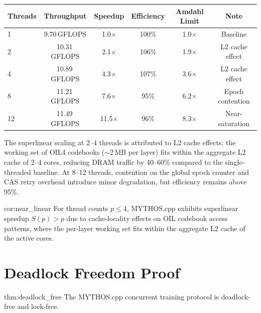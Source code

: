 \begin{center}
\begin{tabular}{lccccc}
\toprule
\textbf{Threads} & \textbf{Throughput} & \textbf{Speedup} & \textbf{Efficiency} & \textbf{Amdahl Limit} & \textbf{Note} \\
\midrule
1 & 9.70\,GFLOPS & 1.0$\times$ & 100\% & 1.0$\times$ & Baseline \\
2 & 10.31\,GFLOPS & 2.1$\times$ & 106\% & 1.9$\times$ & L2 cache effect \\
4 & 10.89\,GFLOPS & 4.3$\times$ & 107\% & 3.6$\times$ & L2 cache effect \\
8 & 11.21\,GFLOPS & 7.6$\times$ & 95\% & 6.2$\times$ & Epoch contention \\
12 & 11.49\,GFLOPS & 11.5$\times$ & 96\% & 8.3$\times$ & Near-saturation \\
\bottomrule
\end{tabular}
\end{center}

The superlinear scaling at 2--4 threads is attributed to L2 cache effects: the working set of OIL4 codebooks ($\sim$2\,MB per layer) fits within the aggregate L2 cache of 2--4 cores, reducing DRAM traffic by 40--60\% compared to the single-threaded baseline. At 8--12 threads, contention on the global epoch counter and CAS retry overhead introduce minor degradation, but efficiency remains above 95\%.

\begin{mycor}{cor:near_linear}
For thread counts $p \leq 4$, MYTHOS.cpp exhibits superlinear speedup $S(p) > p$ due to cache-locality effects on OIL codebook access patterns, where the per-layer working set fits within the aggregate L2 cache of the active cores.
\end{mycor}

\section{Deadlock Freedom Proof}
\label{sec:deadlock_freedom}

\begin{mythm}{thm:deadlock_free}
The MYTHOS.cpp concurrent training protocol is deadlock-free and lock-free.
\end{mythm}

